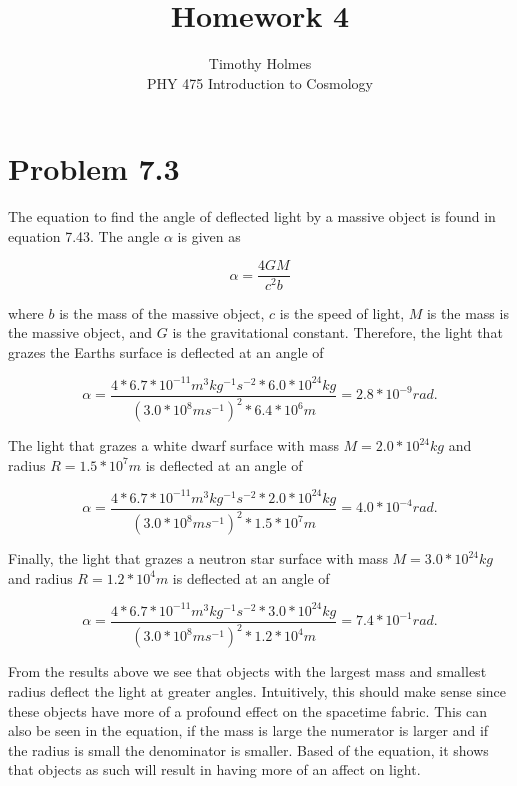 \documentclass[12pt]{article}
\begin{document}
 
 
\title{Homework 4}
\author{Timothy Holmes\\ %
PHY 475 Introduction to Cosmology}

\maketitle

\section*{Problem 7.3}
The equation to find the angle of deflected light by a massive object is found in equation 7.43. The angle $\alpha$ is given as

$$
\alpha = \frac{4GM}{c^{2}b}
$$

where $b$ is the mass of the massive object, $c$ is the speed of light, $M$ is the mass is the massive object, and $G$ is the gravitational constant. Therefore, the light that grazes the Earths surface is deflected at an angle of 

$$
\alpha = \frac{4*6.7*10^{-11}m^{3}kg^{-1}s^{-2}*6.0*10^{24}kg}{(3.0*10^{8}ms^{-1})^{2}*6.4*10^{6}m} = \boxed{2.8*10^{-9} rad}.
$$

The light that grazes a white dwarf surface with mass $M = 2.0*10^{24} kg$ and radius $R = 1.5*10^{7} m$ is deflected at an angle of 

$$
\alpha = \frac{4*6.7*10^{-11}m^{3}kg^{-1}s^{-2}*2.0*10^{24}kg}{(3.0*10^{8}ms^{-1})^{2}*1.5*10^{7}m} = \boxed{4.0*10^{-4} rad}.
$$

Finally, the light that grazes a neutron star surface with mass $M = 3.0*10^{24} kg$ and radius $R = 1.2*10^{4} m$ is deflected at an angle of 

$$
\alpha = \frac{4*6.7*10^{-11}m^{3}kg^{-1}s^{-2}*3.0*10^{24}kg}{(3.0*10^{8}ms^{-1})^{2}*1.2*10^{4}m} = \boxed{7.4*10^{-1} rad}.
$$

From the results above we see that objects with the largest mass and smallest radius deflect the light at greater angles. Intuitively, this should make sense since these objects have more of a profound effect on the spacetime fabric. This can also be seen in the equation, if the mass is large the numerator is larger and if the radius is small the denominator is smaller. Based of the equation, it shows that objects as such will result in having more of an affect on light.
\end{document}
